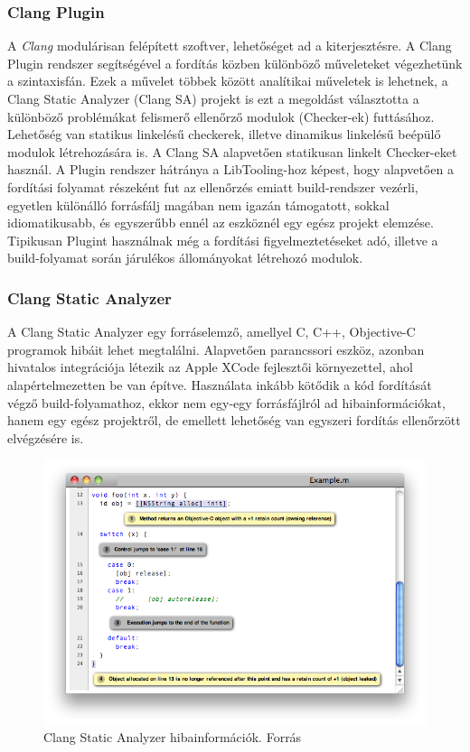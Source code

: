 \documentclass[a4paper,12pt]{report}
\begin{document}
\subsubsection{Clang Plugin}
A \emph{Clang} modulárisan felépített szoftver, lehetőséget ad a kiterjesztésre. A Clang Plugin rendszer segítségével a fordítás közben különböző műveleteket végezhetünk a szintaxisfán. Ezek a művelet többek között analítikai műveletek is lehetnek, a Clang Static Analyzer (Clang SA) projekt is ezt a megoldást választotta a különböző problémákat felismerő ellenőrző modulok (Checker-ek) futtásához. Lehetőség van statikus linkelésű checkerek, illetve dinamikus linkelésű beépülő modulok létrehozására is. A Clang SA alapvetően statikusan linkelt Checker-eket használ. A Plugin rendszer hátránya a LibTooling-hoz képest, hogy alapvetően a fordítási folyamat részeként fut az ellenőrzés emiatt build-rendszer vezérli, egyetlen különálló forrásfálj magában nem igazán támogatott, sokkal idiomatikusabb, és egyszerűbb ennél az eszköznél egy egész projekt elemzése. Tipikusan Plugint használnak még a fordítási figyelmeztetéseket adó, illetve a build-folyamat során járulékos állományokat létrehozó modulok.

\subsubsection{Clang Static Analyzer}
A Clang Static Analyzer egy forráselemző, amellyel C, C++, Objective-C programok hibáit lehet megtalálni. Alapvetően parancssori eszköz, azonban hivatalos integrációja létezik az Apple XCode fejlesztői környezettel, ahol alapértelmezetten be van építve. Használata inkább kötődik a kód fordítását végző build-folyamathoz, ekkor nem egy-egy forrásfájlról ad hibainformációkat, hanem egy egész projektről, de emellett lehetőség van egyszeri fordítás ellenőrzött elvégzésére is.

\begin{figure}[h]
\caption{Clang Static Analyzer hibainformációk. Forrás \cite{clangsaimage}}
\centering
\includegraphics[scale=0.6]{analyzer_html.png}
\end{figure}
\end{document}
